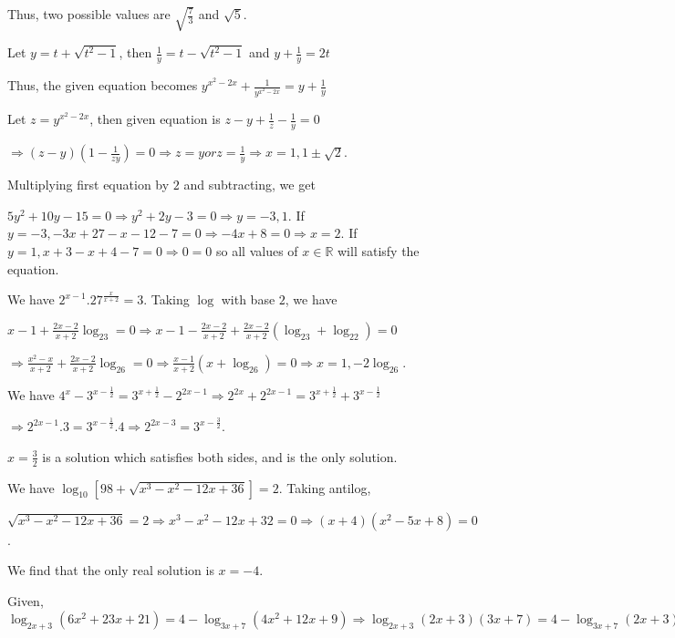   Thus, two possible values are $\sqrt{\frac{7}{3}}$ and $\sqrt{5}$.
\item Let $y = t + \sqrt{t^2 - 1}$, then $\frac{1}{y} = t - \sqrt{t^2 - 1}$ and $y + \frac{1}{y} = 2t$

  Thus, the given equation becomes $y^{x^2 - 2x} + \frac{1}{y^{x^2 - 2x}} = y + \frac{1}{y}$

  Let $z = y^{x^2 - 2x}$, then given equation is $z - y + \frac{1}{z} - \frac{1}{y} = 0$

  $\Rightarrow (z - y)\left(1 - \frac{1}{zy}\right) = 0\Rightarrow z = y or z = \frac{1}{y}\Rightarrow x =
  1, 1\pm\sqrt{2}$.
\item Multiplying first equation by $2$ and subtracting, we get

  $5y^2 + 10y -15 = 0 \Rightarrow y^2 + 2y - 3 = 0 \Rightarrow y = -3, 1$. If $y = -3, -3x + 27 - x - 12 - 7
  = 0 \Rightarrow -4x + 8 = 0\Rightarrow x = 2$. If $y = 1, x + 3 - x + 4 - 7 = 0\Rightarrow 0 = 0$ so all
  values of $x\in\mathbb{R}$ will satisfy the equation.
\item We have $2^{x - 1}.27^{\tfrac{x}{x + 2}} = 3$. Taking $\log$ with base $2$, we have

  $x - 1 + \frac{2x - 2}{x + 2}\log_23 = 0 \Rightarrow x - 1 - \frac{2x - 2}{x + 2} + \frac{2x - 2}{x +
  2}(\log_23 + \log_22) = 0$

  $\Rightarrow \frac{x^2 - x}{x + 2} + \frac{2x - 2}{x + 2}\log_26 = 0\Rightarrow \frac{x - 1}{x + 2}(x +
  \log_26) = 0\Rightarrow x = 1, -2\log_26$.
\item We have $4^x - 3^{x - \tfrac{1}{2}} = 3^{x + \tfrac{1}{2}} - 2^{2x - 1} \Rightarrow 2^{2x} + 2^{2x -
  1} = 3^{x + \frac{1}{2}} + 3^{x - \frac{1}{2}}$

  $\Rightarrow 2^{2x - 1}.3 = 3^{x - \frac{1}{2}}.4 \Rightarrow 2^{2x - 3} = 3^{x - \frac{3}{2}}$.

  $x = \frac{3}{2}$ is a solution which satisfies both sides, and is the only solution.
\item We have $\log_{10}[98 + \sqrt{x^3 - x^2 - 12x + 36}] = 2$. Taking antilog,

  $\sqrt{x^3 - x^2 - 12x + 36} = 2 \Rightarrow x^3 - x^2 - 12x + 32 = 0 \Rightarrow (x + 4)(x^2 - 5x + 8) =
  0$.

  We find that the only real solution is $x = -4$.
\item Given, $\log_{2x + 3}(6x^2 + 23x + 21) = 4 - \log_{3x + 7}(4x^2 + 12x + 9) \Rightarrow \log_{2x +
  3}(2x + 3)(3x + 7) = 4 - \log_{3x + 7}(2x + 3)^2$

